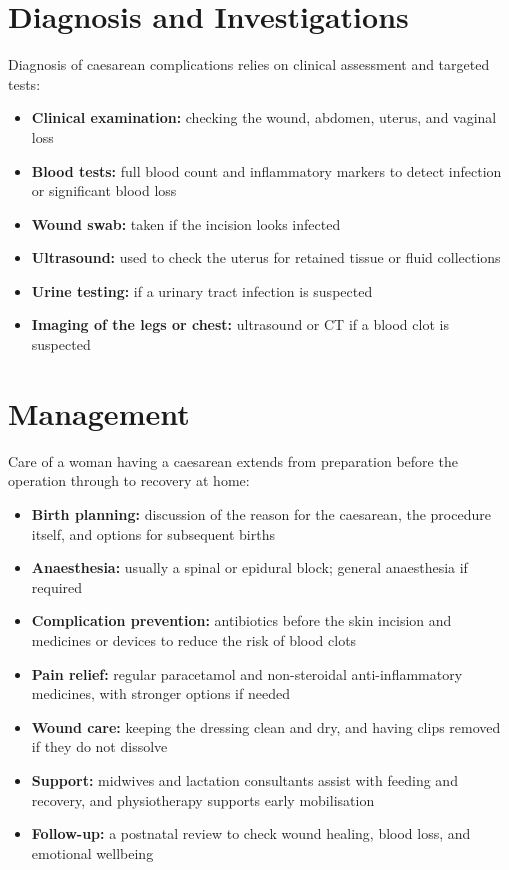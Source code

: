 \section*{Diagnosis and Investigations}
Diagnosis of caesarean complications relies on clinical assessment and targeted tests:
\begin{itemize}
    \item \textbf{Clinical examination:} checking the wound, abdomen, uterus, and vaginal loss
    \item \textbf{Blood tests:} full blood count and inflammatory markers to detect infection or significant blood loss
    \item \textbf{Wound swab:} taken if the incision looks infected
    \item \textbf{Ultrasound:} used to check the uterus for retained tissue or fluid collections
    \item \textbf{Urine testing:} if a urinary tract infection is suspected
    \item \textbf{Imaging of the legs or chest:} ultrasound or CT if a blood clot is suspected
\end{itemize}

\section*{Management}
Care of a woman having a caesarean extends from preparation before the operation through to recovery at home:
\begin{itemize}
    \item \textbf{Birth planning:} discussion of the reason for the caesarean, the procedure itself, and options for subsequent births
    \item \textbf{Anaesthesia:} usually a spinal or epidural block; general anaesthesia if required
    \item \textbf{Complication prevention:} antibiotics before the skin incision and medicines or devices to reduce the risk of blood clots
    \item \textbf{Pain relief:} regular paracetamol and non-steroidal anti-inflammatory medicines, with stronger options if needed
    \item \textbf{Wound care:} keeping the dressing clean and dry, and having clips removed if they do not dissolve
    \item \textbf{Support:} midwives and lactation consultants assist with feeding and recovery, and physiotherapy supports early mobilisation
    \item \textbf{Follow-up:} a postnatal review to check wound healing, blood loss, and emotional wellbeing
\end{itemize}

